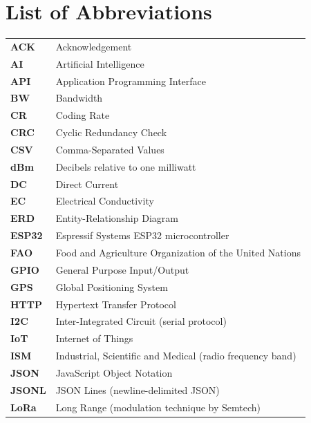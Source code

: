 
\chapter*{List of Abbreviations}

\begin{tabular}{p{3.5cm} p{10cm}}
\textbf{ACK}  & Acknowledgement \\[3pt]
\textbf{AI}   & Artificial Intelligence \\[3pt]
\textbf{API}  & Application Programming Interface \\[3pt]
\textbf{BW}   & Bandwidth \\[3pt]
\textbf{CR}   & Coding Rate \\[3pt]
\textbf{CRC}  & Cyclic Redundancy Check \\[3pt]
\textbf{CSV}  & Comma-Separated Values \\[3pt]
\textbf{dBm}  & Decibels relative to one milliwatt \\[3pt]
\textbf{DC}   & Direct Current \\[3pt]
\textbf{EC}   & Electrical Conductivity \\[3pt]
\textbf{ERD}  & Entity-Relationship Diagram \\[3pt]
\textbf{ESP32}& Espressif Systems ESP32 microcontroller \\[3pt]
\textbf{FAO}  & Food and Agriculture Organization of the United Nations \\[3pt]
\textbf{GPIO} & General Purpose Input/Output \\[3pt]
\textbf{GPS}  & Global Positioning System \\[3pt]
\textbf{HTTP} & Hypertext Transfer Protocol \\[3pt]
\textbf{I2C}  & Inter-Integrated Circuit (serial protocol) \\[3pt]
\textbf{IoT}  & Internet of Things \\[3pt]
\textbf{ISM}  & Industrial, Scientific and Medical (radio frequency band) \\[3pt]
\textbf{JSON} & JavaScript Object Notation \\[3pt]
\textbf{JSONL}& JSON Lines (newline-delimited JSON) \\[3pt]
\textbf{LoRa} & Long Range (modulation technique by Semtech) \\[3pt]

\end{tabular}
